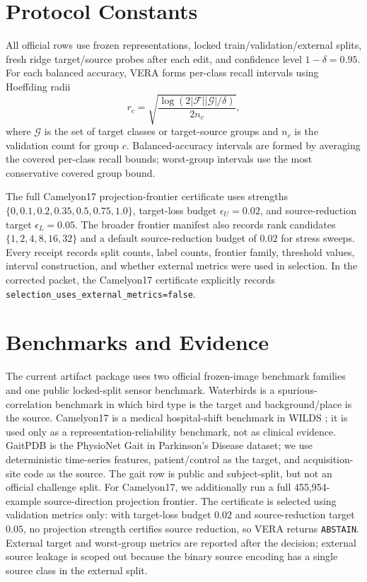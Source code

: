 \documentclass[10pt]{article}
\begin{document}
\section{Protocol Constants}

All official rows use frozen representations, locked train/validation/external
splits, fresh ridge target/source probes after each edit, and confidence level
$1-\delta=0.95$. For each balanced accuracy, VERA forms per-class recall
intervals using Hoeffding radii
\[
r_c=\sqrt{\frac{\log(2|\mathcal{F}||\mathcal{G}|/\delta)}{2n_c}},
\]
where $\mathcal{G}$ is the set of target classes or target-source groups and
$n_c$ is the validation count for group $c$. Balanced-accuracy intervals are
formed by averaging the covered per-class recall bounds; worst-group intervals
use the most conservative covered group bound.

The full Camelyon17 projection-frontier certificate uses strengths
$\{0,0.1,0.2,0.35,0.5,0.75,1.0\}$, target-loss budget
$\epsilon_U=0.02$, and source-reduction target $\epsilon_L=0.05$. The broader
frontier manifest also records rank candidates $\{1,2,4,8,16,32\}$ and a
default source-reduction budget of $0.02$ for stress sweeps. Every receipt
records split counts, label counts, frontier family, threshold values,
interval construction, and whether external metrics were used in selection. In
the corrected packet, the Camelyon17 certificate explicitly records
\texttt{selection\_uses\_external\_metrics=false}.

\section{Benchmarks and Evidence}

The current artifact package uses two official frozen-image benchmark families
and one public locked-split sensor benchmark. Waterbirds is a
spurious-correlation benchmark in which bird type is the target and
background/place is the source. Camelyon17 is a medical hospital-shift
benchmark in WILDS \cite{koh2021wilds}; it is used only as a
representation-reliability benchmark, not as clinical evidence. GaitPDB is the
PhysioNet Gait in Parkinson's Disease dataset; we use deterministic
time-series features, patient/control as the target, and acquisition-site code
as the source. The gait row is public and subject-split, but not an official
challenge split.
For Camelyon17, we additionally run a full 455,954-example source-direction
projection frontier. The certificate is selected using validation metrics only:
with target-loss budget $0.02$ and source-reduction target $0.05$, no projection
strength certifies source reduction, so VERA returns \texttt{ABSTAIN}. External
target and worst-group metrics are reported after the decision; external source
leakage is scoped out because the binary source encoding has a single source
class in the external split.
\end{document}
